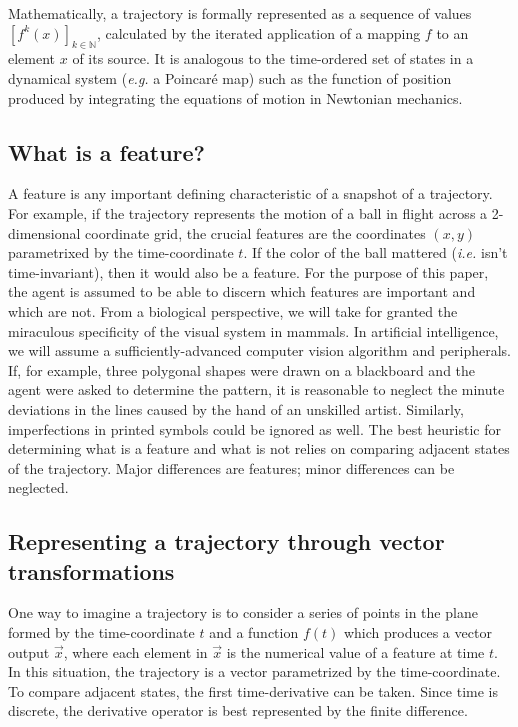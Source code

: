 \documentclass{article}
\begin{document}
Mathematically, a trajectory is formally represented as a sequence of values $\left[ f^k(x) \right]_{k \in \mathbb{N}}$,
calculated by the iterated application of a mapping $f$ to an element $x$ of its source.
It is analogous to the time-ordered set of states in a dynamical system (\textit{e.g.} a Poincar\'e map)
such as the function of position produced by integrating the equations of motion in Newtonian mechanics.

\subsection{What is a feature?}

A feature is any important defining characteristic of a snapshot of a trajectory.
For example, if the trajectory represents the motion of a ball in flight across a 2-dimensional coordinate grid,
the crucial features are the coordinates $(x, y)$ parametrixed by the time-coordinate $t$.
If the color of the ball mattered (\textit{i.e.} isn't time-invariant), then it would also be a feature.
For the purpose of this paper, the agent is assumed to be able to discern which features are important and which are not.
From a biological perspective, we will take for granted the miraculous specificity of the visual system in mammals.
In artificial intelligence, we will assume a sufficiently-advanced computer vision algorithm and peripherals.
If, for example, three polygonal shapes were drawn on a blackboard and the agent were asked to determine the pattern,
it is reasonable to neglect the minute deviations in the lines caused by the hand of an unskilled artist.
Similarly, imperfections in printed symbols could be ignored as well.
The best heuristic for determining what is a feature and what is not relies on comparing adjacent states of the trajectory.
Major differences are features; minor differences can be neglected.

\subsection{Representing a trajectory through vector transformations}
\label{sec:vectorrepresentation}

One way to imagine a trajectory is to consider a series of points in the plane formed by the time-coordinate $t$
and a function $f(t)$ which produces a vector output $\vec{x}$,
where each element in $\vec{x}$ is the numerical value of a feature at time $t$.
In this situation, the trajectory is a vector parametrized by the time-coordinate.
To compare adjacent states, the first time-derivative can be taken.
Since time is discrete, the derivative operator is best represented by the finite difference.
\end{document}
